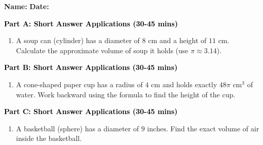 \documentclass[12pt, letterpaper, fleqn]{article}
\begin{document}
\textbf{Name:} \underline{\hspace{5cm}}
\hfill
\textbf{Date:} \underline{\hspace{3cm}}\\


\begin{tcolorbox}[colback=customteal!20]
\large\textcolor{black}{\textbf{Part A: Short Answer Applications (30-45 mins)}}
\end{tcolorbox}

\vspace{3mm}

\begin{enumerate}[itemsep=4.2cm, leftmargin=0.6cm]
\item A soup can (cylinder) has a diameter of $8\text{ cm}$ and a height of $11\text{ cm}$. Calculate the approximate volume of soup it holds (use $\pi \approx 3.14$).
\end{enumerate}

\newpage

\begin{tcolorbox}[colback=customteal!20]
\large\textcolor{black}{\textbf{Part B: Short Answer Applications (30-45 mins)}}
\end{tcolorbox}

\vspace{3mm}

\begin{enumerate}[itemsep=4.2cm, leftmargin=0.6cm, resume]
\item A cone-shaped paper cup has a radius of $4\text{ cm}$ and holds exactly $48\pi\text{ cm}^3$ of water. Work backward using the formula to find the height of the cup.
\end{enumerate}

\newpage

\begin{tcolorbox}[colback=customteal!20]
\large\textcolor{black}{\textbf{Part C: Short Answer Applications (30-45 mins)}}
\end{tcolorbox}

\vspace{3mm}

\begin{enumerate}[itemsep=4.2cm, leftmargin=0.6cm, resume]
\item A basketball (sphere) has a diameter of $9\text{ inches}$. Find the exact volume of air inside the basketball.
\end{enumerate}
\end{document}
